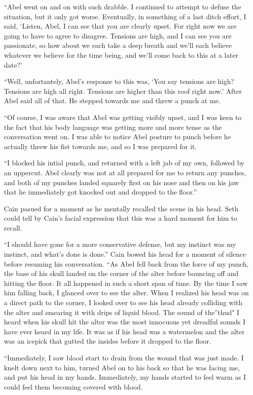 \documentclass[12pt,twoside,titlepage]{report}
\begin{document}
``Abel went on and on with such drabble. I continued to attempt to
defuse the situation, but it only got worse. Eventually, in something of
a last ditch effort, I said, `Listen, Abel, I can see that you are
clearly upset. For right now we are going to have to agree to disagree.
Tensions are high, and I can see you are passionate, so how about we
each take a deep breath and we'll each believe whatever we believe for
the time being, and we'll come back to this at a later date?'

``Well, unfortantely, Abel's response to this was, `You say tensions are
high? Tensions are high all right. Tensions are higher than this roof
right now.' After Abel said all of that. He stepped towards me and threw
a punch at me.

``Of course, I was aware that Abel was getting visibly upset, and I was
keen to the fact that his body language was getting more and more tense
as the conversation went on. I was able to notice Abel posture to punch
before he actually threw his fist towards me, and so I was prepared for
it.

``I blocked his intial punch, and returned with a left jab of my own,
followed by an uppercut. Abel clearly was not at all prepared for me to
return any punches, and both of my punches landed squarely first on his
nose and then on his jaw that he immediately got knocked out and dropped
to the floor.''

Cain pasued for a moment as he mentally recalled the scene in his head.
Seth could tell by Cain's facial expression that this was a hard moment
for him to recall.

``I should have gone for a more conservative defense, but my instinct
was my instinct, and what's done is done.'' Cain bowed his head for a
moment of silence before resuming his conversation. ``As Abel fell back
from the force of my punch, the base of his skull landed on the corner
of the alter before bouncing off and hitting the floor. It all happened
in such a short span of time. By the time I saw him falling back, I
glanced over to see the alter. When I realized his head was on a direct
path to the corner, I looked over to see his head already colliding with
the alter and smearing it with drips of liquid blood. The sound of
the''thud" I heard when his skull hit the alter was the most innocuous
yet dreadful sounds I have ever heard in my life. It was as if his head
was a watermelon and the alter was an icepick that gutted the insides
before it dropped to the floor.

``Immediately, I saw blood start to drain from the wound that was just
made. I knelt down next to him, turned Abel on to his back so that he
was facing me, and put his head in my hands. Immediately, my hands
started to feel warm as I could feel them becoming covered with blood.
\end{document}
